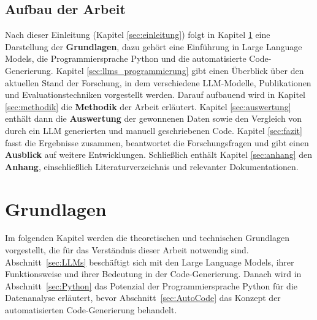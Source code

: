 \documentclass[11pt,a4paper]{article}
\begin{document}
\subsection{Aufbau der Arbeit}
Nach dieser Einleitung (Kapitel \ref{sec:einleitung}) folgt in Kapitel \ref{sec:grundlagen} eine Darstellung der \textbf{Grundlagen}, dazu gehört eine Einführung in Large Language Models, die Programmiersprache Python und die automatisierte Code-Generierung. Kapitel \ref{sec:llms_programmierung} gibt einen Überblick über den aktuellen Stand der Forschung, in dem verschiedene LLM-Modelle, Publikationen und Evaluationstechniken vorgestellt werden. Darauf aufbauend wird in Kapitel \ref{sec:methodik} die \textbf{Methodik} der Arbeit erläutert. Kapitel \ref{sec:auswertung} enthält dann die \textbf{Auswertung} der gewonnenen Daten sowie den Vergleich von durch ein LLM generierten und manuell geschriebenen Code. Kapitel \ref{sec:fazit} fasst die Ergebnisse zusammen, beantwortet die Forschungsfragen und gibt einen \textbf{Ausblick} auf weitere Entwicklungen. Schließlich enthält Kapitel \ref{sec:anhang} den \textbf{Anhang}, einschließlich Literaturverzeichnis und relevanter Dokumentationen.


\section{Grundlagen}
\label{sec:grundlagen}
Im folgenden Kapitel werden die theoretischen und technischen Grundlagen vorgestellt, die für das Verständnis dieser Arbeit notwendig sind. Abschnitt~\ref{sec:LLMs} beschäftigt sich mit den Large Language Models, ihrer Funktionsweise und ihrer Bedeutung in der Code-Generierung. Danach wird in Abschnitt~\ref{sec:Python} das Potenzial der Programmiersprache Python für die Datenanalyse erläutert, bevor Abschnitt~\ref{sec:AutoCode} das Konzept der automatisierten Code-Generierung behandelt.
\end{document}
